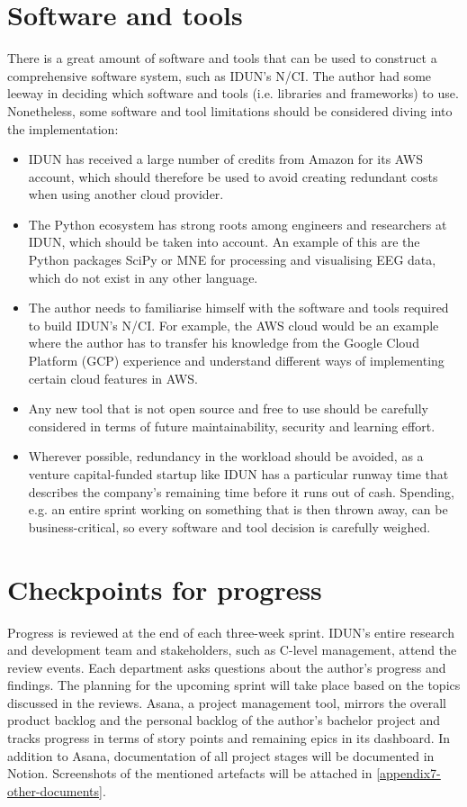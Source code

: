 \section{Software and tools}
\label{chapter3-software-and-tools}

There is a great amount of software and tools that can be used to construct a comprehensive software system, such as IDUN's N/CI. The author had some leeway in deciding which software and tools (i.e. libraries and frameworks) to use. Nonetheless, some software and tool limitations should be considered diving into the implementation:

\begin{itemize}
  \item IDUN has received a large number of credits from Amazon for its AWS account, which should therefore be used to avoid creating redundant costs when using another cloud provider.
  \item The Python ecosystem has strong roots among engineers and researchers at IDUN, which should be taken into account. An example of this are the Python packages SciPy or MNE for processing and visualising EEG data, which do not exist in any other language.
  \item The author needs to familiarise himself with the software and tools required to build IDUN's N/CI. For example, the AWS cloud would be an example where the author has to transfer his knowledge from the Google Cloud Platform (GCP) experience and understand different ways of implementing certain cloud features in AWS.
  \item Any new tool that is not open source and free to use should be carefully considered in terms of future maintainability, security and learning effort.
  \item Wherever possible, redundancy in the workload should be avoided, as a venture capital-funded startup like IDUN has a particular runway time that describes the company's remaining time before it runs out of cash. Spending, e.g. an entire sprint working on something that is then thrown away, can be business-critical, so every software and tool decision is carefully weighed.
\end{itemize}

\section{Checkpoints for progress}
\label{chapter3-checkpoints-for-progress}

Progress is reviewed at the end of each three-week sprint. IDUN's entire research and development team and stakeholders, such as C-level management, attend the review events. Each department asks questions about the author's progress and findings. The planning for the upcoming sprint will take place based on the topics discussed in the reviews. Asana, a project management tool, mirrors the overall product backlog and the personal backlog of the author's bachelor project and tracks progress in terms of story points and remaining epics in its dashboard. In addition to Asana, documentation of all project stages will be documented in Notion. Screenshots of the mentioned artefacts will be attached in \autoref{appendix7-other-documents}.


